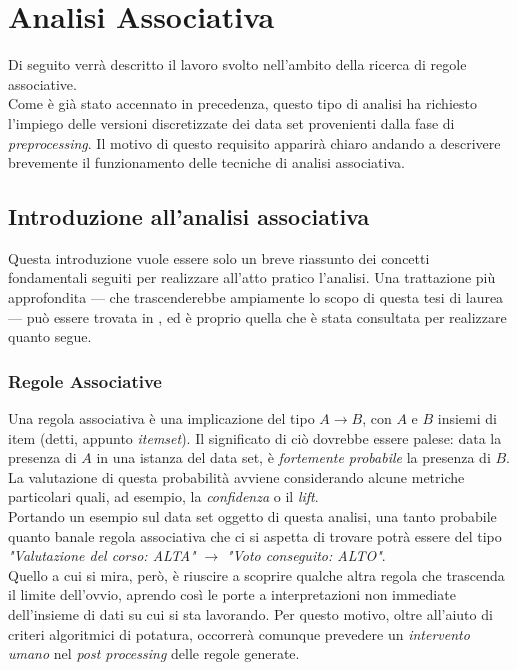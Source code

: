 \chapter{Analisi Associativa}
\label{ch:ass}

Di seguito verrà descritto il lavoro svolto nell'ambito della ricerca di regole associative. \\

Come è già stato accennato in precedenza, questo tipo di analisi ha richiesto l'impiego delle versioni discretizzate dei data set provenienti dalla fase di \textit{preprocessing}. Il motivo di questo requisito apparirà chiaro andando a descrivere brevemente il funzionamento delle tecniche di analisi associativa.

\section{Introduzione all'analisi associativa}

    Questa introduzione vuole essere solo un breve riassunto dei concetti fondamentali seguiti per realizzare all'atto pratico l'analisi. Una trattazione più approfondita --- che trascenderebbe  ampiamente lo scopo di questa tesi di laurea --- può essere trovata in \cite{dispense}, ed è proprio quella che è stata consultata per realizzare quanto segue.

    \subsection{Regole Associative}

        Una regola associativa è una implicazione del tipo $A \rightarrow B$, con $A$ e $B$ insiemi di item (detti, appunto \textit{itemset}). Il significato di ciò dovrebbe essere palese: data la presenza di $A$ in una istanza del data set, è \textit{fortemente probabile} la presenza di $B$. La valutazione di questa probabilità avviene considerando alcune metriche particolari quali, ad esempio, la \textit{confidenza} o il \textit{lift}. \\

        Portando un esempio sul data set oggetto di questa analisi, una tanto probabile quanto banale regola associativa che ci si aspetta di trovare potrà essere del tipo \textit{"Valutazione del corso: ALTA"} $\rightarrow$ \textit{"Voto conseguito: ALTO"}. \\

        Quello a cui si mira, però, è riuscire a scoprire qualche altra regola che trascenda il limite dell'ovvio, aprendo così le porte a interpretazioni non immediate dell'insieme di dati su cui si sta lavorando. Per questo motivo, oltre all'aiuto di criteri algoritmici di potatura, occorrerà comunque prevedere un \textit{intervento umano} nel \textit{post processing} delle regole generate.

